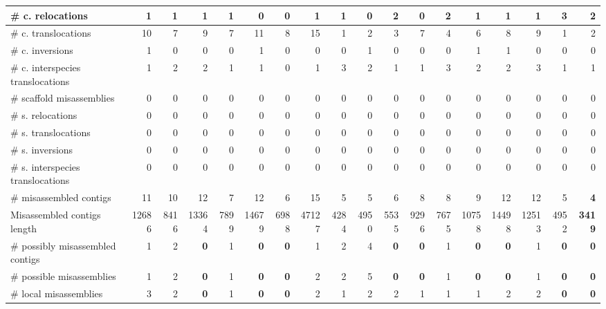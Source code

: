 \documentclass[12pt,a4paper]{article}
\begin{document}
\begin{table}[ht]
\begin{center}
\begin{tabular}{|l*{17}{|r}|}
\hspace{5mm}\# c. relocations & 1 & 1 & 1 & 1 & 0 & 0 & 1 & 1 & 0 & 2 & 0 & 2 & 1 & 1 & 1 & 3 & 2 \\ \hline
\hspace{5mm}\# c. translocations & 10 & 7 & 9 & 7 & 11 & 8 & 15 & 1 & 2 & 3 & 7 & 4 & 6 & 8 & 9 & 1 & 2 \\ \hline
\hspace{5mm}\# c. inversions & 1 & 0 & 0 & 0 & 1 & 0 & 0 & 0 & 1 & 0 & 0 & 0 & 1 & 1 & 0 & 0 & 0 \\ \hline
\hspace{5mm}\# c. interspecies translocations & 1 & 2 & 2 & 1 & 1 & 0 & 1 & 3 & 2 & 1 & 1 & 3 & 2 & 2 & 3 & 1 & 1 \\ \hline
\hspace{2mm}\# scaffold misassemblies & 0 & 0 & 0 & 0 & 0 & 0 & 0 & 0 & 0 & 0 & 0 & 0 & 0 & 0 & 0 & 0 & 0 \\ \hline
\hspace{5mm}\# s. relocations & 0 & 0 & 0 & 0 & 0 & 0 & 0 & 0 & 0 & 0 & 0 & 0 & 0 & 0 & 0 & 0 & 0 \\ \hline
\hspace{5mm}\# s. translocations & 0 & 0 & 0 & 0 & 0 & 0 & 0 & 0 & 0 & 0 & 0 & 0 & 0 & 0 & 0 & 0 & 0 \\ \hline
\hspace{5mm}\# s. inversions & 0 & 0 & 0 & 0 & 0 & 0 & 0 & 0 & 0 & 0 & 0 & 0 & 0 & 0 & 0 & 0 & 0 \\ \hline
\hspace{5mm}\# s. interspecies translocations & 0 & 0 & 0 & 0 & 0 & 0 & 0 & 0 & 0 & 0 & 0 & 0 & 0 & 0 & 0 & 0 & 0 \\ \hline
\# misassembled contigs & 11 & 10 & 12 & 7 & 12 & 6 & 15 & 5 & 5 & 6 & 8 & 8 & 9 & 12 & 12 & 5 & {\bf 4} \\ \hline
Misassembled contigs length & 12686 & 8416 & 13364 & 7899 & 14679 & 6988 & 47127 & 4284 & 4950 & 5535 & 9296 & 7675 & 10758 & 14498 & 12513 & 4952 & {\bf 3419} \\ \hline
\# possibly misassembled contigs & 1 & 2 & {\bf 0} & 1 & {\bf 0} & {\bf 0} & 1 & 2 & 4 & {\bf 0} & {\bf 0} & 1 & {\bf 0} & {\bf 0} & 1 & {\bf 0} & {\bf 0} \\ \hline
\hspace{5mm}\# possible misassemblies & 1 & 2 & {\bf 0} & 1 & {\bf 0} & {\bf 0} & 2 & 2 & 5 & {\bf 0} & {\bf 0} & 1 & {\bf 0} & {\bf 0} & 1 & {\bf 0} & {\bf 0} \\ \hline
\# local misassemblies & 3 & 2 & {\bf 0} & 1 & {\bf 0} & {\bf 0} & 2 & 1 & 2 & 2 & 1 & 1 & 1 & 2 & 2 & {\bf 0} & {\bf 0} \\ \hline

\end{tabular}
\end{center}
\end{table}
\end{document}
